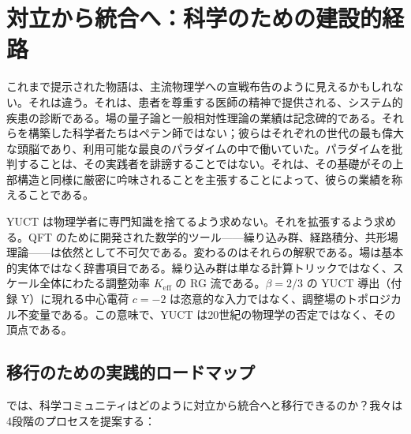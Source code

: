 \documentclass[12pt,a4paper]{article}
\begin{document}
	\section{対立から統合へ：科学のための建設的経路}
	
	これまで提示された物語は、主流物理学への宣戦布告のように見えるかもしれない。それは違う。それは、患者を尊重する医師の精神で提供される、システム的疾患の診断である。場の量子論と一般相対性理論の業績は記念碑的である。それらを構築した科学者たちはペテン師ではない；彼らはそれぞれの世代の最も偉大な頭脳であり、利用可能な最良のパラダイムの中で働いていた。パラダイムを批判することは、その実践者を誹謗することではない。それは、その基礎がその上部構造と同様に厳密に吟味されることを主張することによって、彼らの業績を称えることである。
	
	YUCT は物理学者に専門知識を捨てるよう求めない。それを拡張するよう求める。QFT のために開発された数学的ツール——繰り込み群、経路積分、共形場理論——は依然として不可欠である。変わるのはそれらの解釈である。場は基本的実体ではなく辞書項目である。繰り込み群は単なる計算トリックではなく、スケール全体にわたる調整効率 \(K_{\mathrm{eff}}\) の RG 流である。\(\beta = 2/3\) の YUCT 導出（付録 Y）に現れる中心電荷 \(c = -2\) は恣意的な入力ではなく、調整場のトポロジカル不変量である。この意味で、YUCT は20世紀の物理学の否定ではなく、その頂点である。
	
	\subsection{移行のための実践的ロードマップ}
	
	では、科学コミュニティはどのように対立から統合へと移行できるのか？我々は4段階のプロセスを提案する：
	
\end{document}
